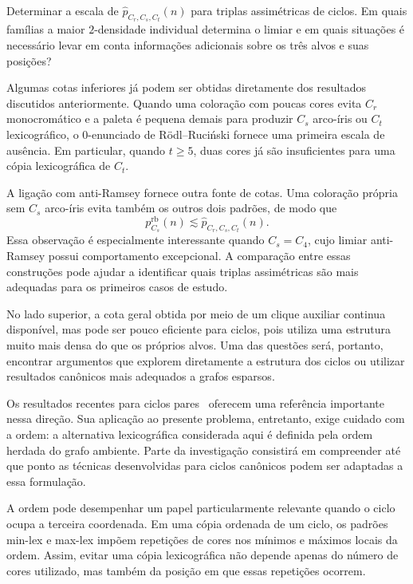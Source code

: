 \documentclass[11pt,a4paper]{article}
\theoremstyle{plain}
\theoremstyle{definition}
\newcounter{question}[section]
\renewcommand{\thequestion}{\thesection.\arabic{question}}
\newenvironment{question}[1][]{%
  \refstepcounter{question}%
  \begin{tcolorbox}[
    enhanced,
    colback=qbluebg,
    colframe=qblue,
    arc=4pt,
    boxrule=1.2pt,
    left=8pt, right=8pt, top=6pt, bottom=6pt,
    fonttitle=\bfseries\sffamily,
    title={\color{white}Pergunta~\thequestion\ifx&#1&\else\ (#1)\fi},
    coltitle=white,
    attach boxed title to top left={yshift=-2mm, xshift=6pt},
    boxed title style={colback=qblue, arc=3pt, boxrule=0pt},
  ]%
  \itshape
}{%
  \end{tcolorbox}%
}
\begin{document}
\begin{question}
  \label{q:ciclos}
  Determinar a escala de
  $\widehat p_{C_r,C_s,C_t}(n)$
  para triplas assimétricas de ciclos. Em quais famílias a maior
  $2$-densidade individual determina o limiar e em quais situações
  é necessário levar em conta informações adicionais sobre os
  três alvos e suas posições?
\end{question}

Algumas cotas inferiores já podem ser obtidas diretamente dos
resultados discutidos anteriormente. Quando uma coloração com poucas
cores evita $C_r$ monocromático e a paleta é pequena demais para
produzir $C_s$ arco-íris ou $C_t$ lexicográfico, o
$0$-enunciado de Rödl--Ruciński fornece uma primeira escala de
ausência. Em particular, quando $t\ge5$, duas cores já são
insuficientes para uma cópia lexicográfica de $C_t$.

A ligação com anti-Ramsey fornece outra fonte de cotas. Uma coloração
própria sem $C_s$ arco-íris evita também os outros dois padrões, de
modo que
\[
  p_{C_s}^{\mathrm{rb}}(n)
  \lesssim
  \widehat p_{C_r,C_s,C_t}(n).
\]
Essa observação é especialmente interessante quando $C_s=C_4$, cujo
limiar anti-Ramsey possui comportamento excepcional. A comparação
entre essas construções pode ajudar a identificar quais triplas
assimétricas são mais adequadas para os primeiros casos de estudo.

No lado superior, a cota geral obtida por meio de um clique auxiliar
continua disponível, mas pode ser pouco eficiente para ciclos, pois
utiliza uma estrutura muito mais densa do que os próprios alvos.
Uma das questões será, portanto, encontrar argumentos que explorem
diretamente a estrutura dos ciclos ou utilizar resultados canônicos
mais adequados a grafos esparsos.

Os resultados recentes para ciclos pares~\cite{AKMM} oferecem uma
referência importante nessa direção. Sua aplicação ao presente
problema, entretanto, exige cuidado com a ordem: a alternativa
lexicográfica considerada aqui é definida pela ordem herdada do
grafo ambiente. Parte da investigação consistirá em compreender até
que ponto as técnicas desenvolvidas para ciclos canônicos podem ser
adaptadas a essa formulação.

A ordem pode desempenhar um papel particularmente relevante quando
o ciclo ocupa a terceira coordenada. Em uma cópia ordenada de um
ciclo, os padrões min-lex e max-lex impõem repetições de cores nos
mínimos e máximos locais da ordem. Assim, evitar uma cópia
lexicográfica não depende apenas do número de cores utilizado, mas
também da posição em que essas repetições ocorrem.
\end{document}
